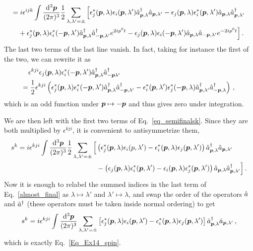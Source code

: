 \begin{sol}
\begin{equation}
\begin{split}
            = &\;  i \epsilon^{ijk} \int \frac{\rm{\rm d}^3\boldsymbol{p}}{(2\pi)^{3}} \frac{1}{2}\sum_{\lambda, \lambda'=\pm}\Big[\epsilon^*_{j}(\boldsymbol{p},\lambda)\epsilon_{i}(\boldsymbol{p}, \lambda')\hat{a}^\dagger_{\boldsymbol{p},\lambda}\hat{a}_{\boldsymbol{p}, \lambda'} - \epsilon_{j}(\boldsymbol{p},\lambda)\epsilon^*_{i}(\boldsymbol{p}, \lambda')\hat{a}_{\boldsymbol{p}, \lambda}\hat{a}^\dagger_{\boldsymbol{p}, \lambda'} \\
            & + \epsilon^*_{j}(\boldsymbol{p},\lambda)\epsilon^*_{i}(-\boldsymbol{p}, \lambda')\hat{a}^\dagger_{\boldsymbol{p},\lambda}\hat{a}^\dagger_{-\boldsymbol{p}, \lambda'}e^{2ip^{0}t} - \epsilon_{j}(\boldsymbol{p},\lambda)\epsilon_{i}(-\boldsymbol{p}, \lambda')\hat{a}_{\boldsymbol{p},\lambda}\hat{a}_{-\boldsymbol{p}, \lambda'}e^{-2ip^{0}t}\Big]\, .
    \end{split}
    \end{equation}
    The last two terms of the last line vanish. In fact, taking for instance the first of the two, we can rewrite it as
    \begin{equation}
    \begin{split}
        & \epsilon^{kji} \epsilon_{j}(\boldsymbol{p},\lambda)\epsilon^*_{i}(-\boldsymbol{p}, \lambda')\hat{a}^\dagger_{\boldsymbol{p}, \lambda}\hat{a}^\dagger_{-\boldsymbol{p} \lambda'}  \\
        = &\; \frac{1}{2}\epsilon^{kji}\left(\epsilon^*_{j}(\boldsymbol{p},\lambda)\epsilon^*_{i}(-\boldsymbol{p}, \lambda')\hat{a}^\dagger_{\boldsymbol{p},\lambda}\hat{a}^\dagger_{-\boldsymbol{p},\lambda'}
        - \epsilon^*_{i}(\boldsymbol{p},\lambda')\epsilon^*_{j}(-\boldsymbol{p}, \lambda)\hat{a}^\dagger_{\boldsymbol{p}, \lambda'}\hat{a}^\dagger_{-\boldsymbol{p}, \lambda}\right)\,,
    \end{split}
    \end{equation}
    which is an odd function under $\boldsymbol{p} \mapsto - \boldsymbol{p}$ and thus gives zero under integration. \par 
    We are then left with the first two terms of Eq.~\ref{eq_semifinalsk}. Since they are both multiplied by $\epsilon^{kji}$, it is convenient to antisymmetrize them,
    \begin{equation}
    \label{almost_final}
    \begin{split}
        s^{k} = i\epsilon^{kji} \int \frac{\rm{\rm d}^3\boldsymbol{p}}{(2\pi)^{3}}\frac{1}{2}\sum_{\lambda, \lambda'=\pm}\Big[&\left(\epsilon^*_{j}(\boldsymbol{p},\lambda)\epsilon_{i}(p, \lambda') - \epsilon^*_{i}(\boldsymbol{p},\lambda)\epsilon_{j}(\boldsymbol{p}, \lambda')\right)\hat{a}^\dagger_{\boldsymbol{p}, \lambda}\hat{a}_{\boldsymbol{p}, \lambda'} \\
        &- \left(\epsilon_{j}(\boldsymbol{p},\lambda)\epsilon^*_{i}(\boldsymbol{p}, \lambda') - \epsilon_{i}(\boldsymbol{p},\lambda)\epsilon^*_{j}(\boldsymbol{p}, \lambda')\right)\hat{a}_{\boldsymbol{p},\lambda}\hat{a}^\dagger_{\boldsymbol{p}, \lambda'}\Big]\, .
    \end{split}
    \end{equation}
    Now it is enough to relabel the summed indices in the last term of Eq.~\eqref{almost_final} as $\lambda \mapsto \lambda'$ and $\lambda' \mapsto \lambda$, and swap the order of the operators $\hat{a}$ and $\hat{a}^\dagger$ (these operators must be taken inside normal ordering) to get 
    \begin{equation}
        s^{k} = i \epsilon^{kji} \int \frac{\rm{\rm d}^3\boldsymbol{p}}{(2\pi)^{3}}\sum_{\lambda ,\lambda'=\pm}\left[\epsilon^*_{j}(\boldsymbol{p},\lambda)\epsilon_{i}(\boldsymbol{p}, \lambda') - \epsilon^*_{i}(\boldsymbol{p},\lambda)\epsilon_{j}(\boldsymbol{p}, \lambda')\right]\hat{a}^\dagger_{\boldsymbol{p},\lambda}\hat{a}_{\boldsymbol{p}, \lambda'} \,,
    \end{equation}
    which is exactly Eq.~\eqref{Eq_Ex14_spin}.
\end{sol}